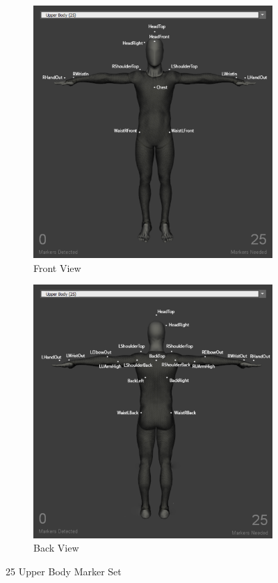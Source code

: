 \begin{figure}[!htbp]
    \centering
    \begin{subfigure}[b]{0.45\columnwidth}
        \includegraphics[width=\textwidth]{images/skleton.png}
        \caption{Front View }
        \label{fig:opti1}
    \end{subfigure}
    \begin{subfigure}[b]{0.45\columnwidth}
        \includegraphics[width=\textwidth]{images/skeleton2.png}
        \caption{Back View }
        \label{fig:opti2}
    \end{subfigure}
    \caption{25 Upper Body Marker Set \parencite{opti}}
    \label{fig:opti3}
\end{figure}

